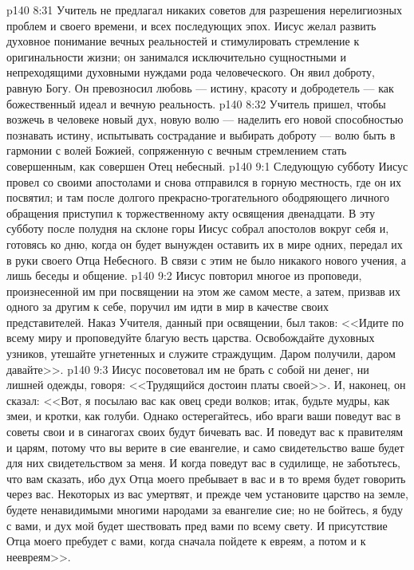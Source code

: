 \vs p140 8:31 Учитель не предлагал никаких советов для разрешения нерелигиозных проблем и своего времени, и всех последующих эпох. Иисус желал развить духовное понимание вечных реальностей и стимулировать стремление к оригинальности жизни; он занимался исключительно сущностными и непреходящими духовными нуждами рода человеческого. Он явил доброту, равную Богу. Он превозносил любовь --- истину, красоту и добродетель --- как божественный идеал и вечную реальность.
\vs p140 8:32 Учитель пришел, чтобы возжечь в человеке новый дух, новую волю --- наделить его новой способностью познавать истину, испытывать сострадание и выбирать доброту --- волю быть в гармонии с волей Божией, сопряженную с вечным стремлением стать совершенным, как совершен Отец небесный.
\vs p140 9:1 Следующую субботу Иисус провел со своими апостолами и снова отправился в горную местность, где он их посвятил; и там после долгого прекрасно\hyp{}трогательного ободряющего личного обращения приступил к торжественному акту освящения двенадцати. В эту субботу после полудня на склоне горы Иисус собрал апостолов вокруг себя и, готовясь ко дню, когда он будет вынужден оставить их в мире одних, передал их в руки своего Отца Небесного. В связи с этим не было никакого нового учения, а лишь беседы и общение.
\vs p140 9:2 Иисус повторил многое из проповеди, произнесенной им при посвящении на этом же самом месте, а затем, призвав их одного за другим к себе, поручил им идти в мир в качестве своих представителей. Наказ Учителя, данный при освящении, был таков: <<Идите по всему миру и проповедуйте благую весть царства. Освобождайте духовных узников, утешайте угнетенных и служите страждущим. Даром получили, даром давайте>>.
\vs p140 9:3 Иисус посоветовал им не брать с собой ни денег, ни лишней одежды, говоря: <<Трудящийся достоин платы своей>>. И, наконец, он сказал: <<Вот, я посылаю вас как овец среди волков; итак, будьте мудры, как змеи, и кротки, как голуби. Однако остерегайтесь, ибо враги ваши поведут вас в советы свои и в синагогах своих будут бичевать вас. И поведут вас к правителям и царям, потому что вы верите в сие евангелие, и само свидетельство ваше будет для них свидетельством за меня. И когда поведут вас в судилище, не заботьтесь, что вам сказать, ибо дух Отца моего пребывает в вас и в то время будет говорить через вас. Некоторых из вас умертвят, и прежде чем установите царство на земле, будете ненавидимыми многими народами за евангелие сие; но не бойтесь, я буду с вами, и дух мой будет шествовать пред вами по всему свету. И присутствие Отца моего пребудет с вами, когда сначала пойдете к евреям, а потом и к неевреям>>.
